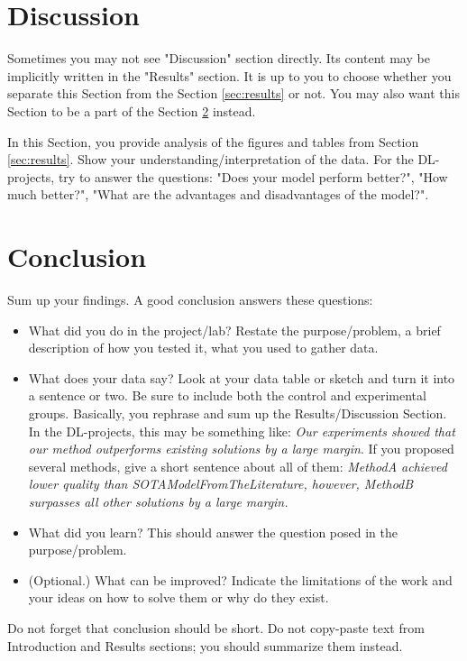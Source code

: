 \documentclass[10pt,conference,compsocconf]{IEEEtran}
\begin{document}
\section{Discussion}
Sometimes you may not see "Discussion" section directly. Its content may be implicitly written in the "Results" section. It is up to you to choose whether you separate this Section from the Section \ref{sec:results} or not. You may also want this Section to be a part of the Section \ref{sec:conclusion} instead.

In this Section, you provide analysis of the figures and tables from Section \ref{sec:results}. Show your understanding/interpretation of the data. For the DL-projects, try to answer the questions: "Does your model perform better?", "How much better?", "What are the advantages and disadvantages of the model?".


\section{Conclusion}\label{sec:conclusion}
Sum up your findings. A good conclusion answers these questions:
\begin{itemize}

\item What did you do in the project/lab? Restate the purpose/problem, a brief description of how you tested it, what you used to gather data.
\item What does your data say? Look at your data table or sketch and turn it into a sentence or two. Be sure to include both the control and experimental groups. Basically, you rephrase and sum up the Results/Discussion Section. In the DL-projects, this may be something like: \textit{Our experiments showed that our method outperforms existing solutions by a large margin}. If you proposed several methods, give a short sentence about all of them: \textit{MethodA achieved lower quality than SOTAModelFromTheLiterature, however, MethodB surpasses all other solutions by a large margin.}
\item What did you learn? This should answer the question posed in the purpose/problem.
\item (Optional.) What can be improved? Indicate the limitations of the work and your ideas on how to solve them or why do they exist.
\end{itemize}

Do not forget that conclusion should be short. Do not copy-paste text from Introduction and Results sections; you should summarize them instead.
\end{document}

